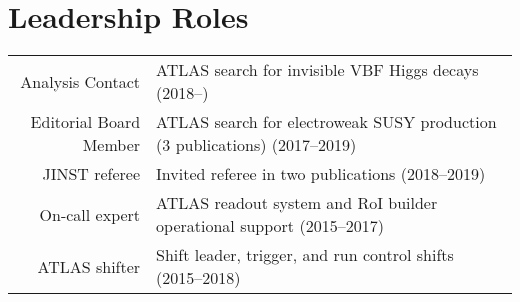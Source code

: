 \documentclass[a4paper,10pt]{article}
\begin{document}
\vspace{3mm}
\section{Leadership Roles}
\begin{tabular}{r | p{12cm}}
\multicolumn{1}{r|}{Analysis Contact}			& ATLAS search for invisible VBF Higgs decays  \hfill (2018--\phantom{0000}) \\
\multicolumn{1}{r|}{Editorial Board Member}		& ATLAS search for electroweak SUSY production (3 publications)  \hfill (2017--2019)\\
\multicolumn{1}{r|}{JINST referee}		        & Invited referee in two publications \hfill (2018--2019)	\\
\multicolumn{1}{r|}{On-call expert}              & ATLAS readout system and RoI builder operational support	\hfill (2015--2017)					\\
\multicolumn{1}{r|}{ATLAS shifter}			     & Shift leader, trigger, and run control shifts	\hfill (2015--2018)					\\
\end{tabular}


\vspace{3mm}
\end{document}

